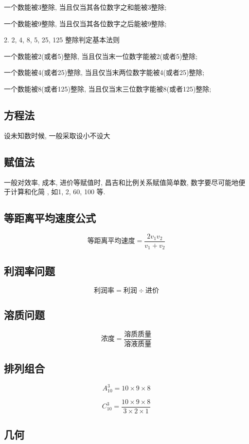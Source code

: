 \documentclass[UTF8]{ctexart}
\begin{document}
一个数能被3整除, 当且仅当其各位数字之和能被3整除;

一个数能被9整除, 当且仅当其各位数字之后能被9整除;

2. 2, 4, 8, 5, 25, 125 整除判定基本法则

一个数能被2(或者5)整除, 当且仅当末一位数字能被2(或者5)整除;

一个数能被4(或者25)整除, 当且仅当末两位数字能被4(或者25)整除;

一个数能被8(或者125)整除, 当且仅当末三位数字能被8(或者125)整除;

\subsection{方程法}

设未知数时候, 一般采取设小不设大

\subsection{赋值法}

一般对效率, 成本, 进价等赋值时, 昌吉和比例关系赋值简单数, 数字要尽可能地便于计算和化简
, 如1, 2, 60, 100 等.

\subsection{等距离平均速度公式}

$$
	\mbox{等距离平均速度} = \frac{2v_1 v_2}{v_1 + v_2}
$$

\subsection{利润率问题}

$$
	\mbox{利润率} = \mbox{利润} \div \mbox{进价}
$$

\subsection{溶质问题}
$$
	\mbox{浓度}=\frac{\mbox{溶质质量}}{\mbox{溶液质量}}
$$

\subsection{排列组合}
$$
	A^{3}_{10} = 10 \times 9 \times 8
$$

$$
	C^{3}_{10} = \frac{10 \times 9 \times 8}{3 \times 2 \times 1}
$$

\subsection{几何}
\end{document}
